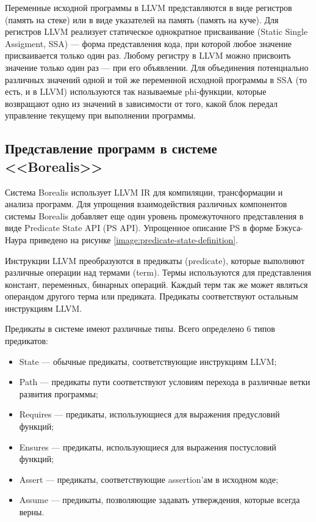 Переменные исходной программы в LLVM представляются в виде регистров (память на стеке) или в виде указателей на память (память на куче). Для регистров LLVM реализует статическое однократное присваивание (Static Single Assigment, SSA) --- форма представления кода, при которой любое значение присваивается только один раз. Любому регистру в LLVM можно присвоить значение только один раз --- при его объявлении. Для объединения потенциально различных значений одной и той же переменной исходной программы в SSA (то есть, и в LLVM) используются так называемые phi-функции, которые возвращают одно из значений в зависимости от того, какой блок передал управление текущему при выполнении программы.

\subsection{Представление программ в системе <<Borealis>>}
Система Borealis использует LLVM IR для компиляции, трансформации и анализа программ. Для упрощения взаимодействия различных компонентов системы Borealis добавляет еще один уровень промежуточного представления в виде Predicate State API (PS API). Упрощенное описание PS в форме Бэкуса-Наура приведено на рисунке \ref{image:predicate-state-definition}.
	
Инструкции LLVM преобразуются в предикаты (predicate), которые выполняют различные операции над термами (term). Термы используются для представления констант, переменных, бинарных операций. Каждый терм так же может являться операндом другого терма или предиката. Предикаты соответствуют остальным инструкциям LLVM.
	
Предикаты в системе имеют различные типы. Всего определено 6 типов предикатов:
\begin{itemize}
\item State --- обычные предикаты, соответствующие инструкциям LLVM;
\item Path --- предикаты пути соответствуют условиям перехода в различные ветки развития программы;
\item Requires --- предикаты, использующиеся для выражения предусловий функций;
\item Ensures --- предикаты, использующиеся для выражения постусловий функций;
\item Assert --- предикаты, соответствующие assertion'ам в исходном коде;
\item Assume --- предикаты, позволяющие задавать утверждения, которые всегда верны.
\end{itemize}


